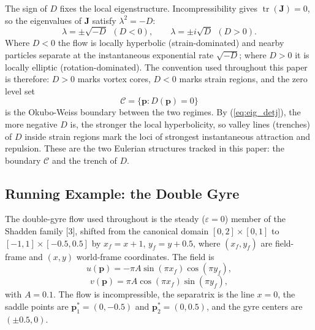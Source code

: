 \documentclass[lettersize,journal]{IEEEtran}
\begin{document}
The sign of $D$ fixes the local eigenstructure. Incompressibility gives
$\operatorname{tr}(\mathbf{J}) = 0$, so the eigenvalues of $\mathbf{J}$
satisfy $\lambda^2 = -D$:
\begin{equation}
    \lambda = \pm\sqrt{-D} \ \ (D < 0), \qquad
    \lambda = \pm i\sqrt{D} \ \ (D > 0).
    \label{eq:eig_detj}
\end{equation}
Where $D < 0$ the flow is locally hyperbolic (strain-dominated) and
nearby particles separate at the instantaneous exponential rate
$\sqrt{-D}$; where $D > 0$ it is locally elliptic (rotation-dominated).
The convention used throughout this paper is therefore: $D > 0$ marks
vortex cores, $D < 0$ marks strain regions, and the zero level set
\begin{equation}
    \mathcal{C} = \{\mathbf{p} : D(\mathbf{p}) = 0\}
    \label{eq:ow_boundary}
\end{equation}
is the Okubo-Weiss boundary between the two regimes. By
(\ref{eq:eig_detj}), the more negative $D$ is, the stronger the local
hyperbolicity, so valley lines (trenches) of $D$ inside strain regions
mark the loci of strongest instantaneous attraction and repulsion. These
are the two Eulerian structures tracked in this paper: the boundary
$\mathcal{C}$ and the trench of $D$.

\subsection{Running Example: the Double Gyre}
\label{sec:dg_example}

The double-gyre flow used throughout is the steady ($\varepsilon = 0$)
member of the Shadden family [3], shifted from the canonical domain
$[0,2] \times [0,1]$ to $[-1,1] \times [-0.5, 0.5]$ by
$x_f = x + 1$, $y_f = y + 0.5$, where $(x_f, y_f)$ are field-frame and
$(x, y)$ world-frame coordinates. The field is
\begin{equation}
    u(\mathbf{p}) = -\pi A \sin(\pi x_f) \cos(\pi y_f), \label{eq:dg_u}
\end{equation}
\begin{equation}
    v(\mathbf{p}) = \pi A \cos(\pi x_f) \sin(\pi y_f), \label{eq:dg_v}
\end{equation}
with $A = 0.1$. The flow is incompressible, the separatrix is the line
$x = 0$, the saddle points are $\mathbf{p}^*_1 = (0, -0.5)$ and
$\mathbf{p}^*_2 = (0, 0.5)$, and the gyre centers are $(\pm 0.5, 0)$.
\end{document}
